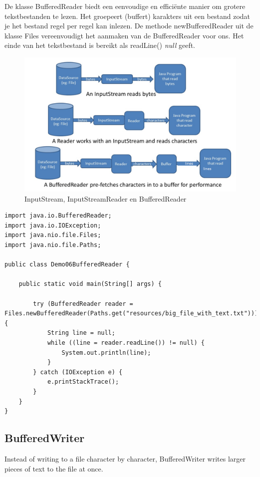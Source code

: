 De klasse BufferedReader biedt een eenvoudige en effici\"ente manier om grotere tekstbestanden te lezen. Het groepeert (buffert) karakters uit een bestand zodat je het bestand regel per regel kan inlezen. De methode newBufferedReader uit de klasse Files vereenvoudigt het aanmaken van de BufferedReader voor ons.
Het einde van het tekstbestand is bereikt als readLine() \textit{null} geeft.

\begin{figure}[H]
  \includegraphics[width=\linewidth]{images/h8/stream_reader.png}
  \caption{InputStream, InputStreamReader en BufferedReader}
  \label{fig:paths}
\end{figure}

\begin{lstlisting}
import java.io.BufferedReader;
import java.io.IOException;
import java.nio.file.Files;
import java.nio.file.Paths;

public class Demo06BufferedReader {

	public static void main(String[] args) {

		try (BufferedReader reader =  Files.newBufferedReader(Paths.get("resources/big_file_with_text.txt"))) {
			String line = null;
			while ((line = reader.readLine()) != null) {
				System.out.println(line);
			}
		} catch (IOException e) {
			e.printStackTrace();
		}
	}
}
\end{lstlisting}

\subsection{BufferedWriter}


Instead of writing to a file character by character, BufferedWriter writes larger pieces of text to the file at once.

